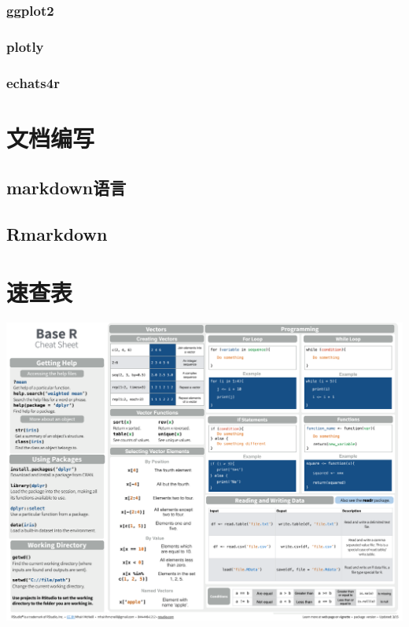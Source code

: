 \documentclass[]{book}
\begin{document}
\hypertarget{ggplot2}{%
\subsection{ggplot2}\label{ggplot2}}

\hypertarget{plotly}{%
\subsection{plotly}\label{plotly}}

\hypertarget{echats4r}{%
\subsection{echats4r}\label{echats4r}}

\hypertarget{section-36}{%
\chapter{文档编写}\label{section-36}}

\hypertarget{markdown}{%
\section{markdown语言}\label{markdown}}

\hypertarget{rmarkdown}{%
\section{Rmarkdown}\label{rmarkdown}}

\hypertarget{section-37}{%
\chapter{速查表}\label{section-37}}

\includegraphics{figures/cheatsheet1.png}
\end{document}
